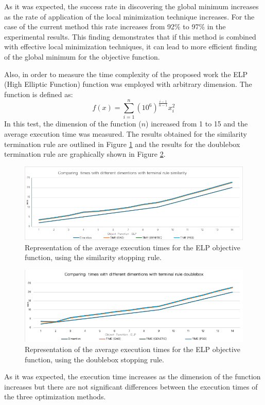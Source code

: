 \documentclass[journal,article,submit,pdftex,moreauthors]{Definitions/mdpi}
\begin{document}
As it was expected, the success rate in discovering the global minimum increases as the rate of application of the local minimization technique increases. For the case of the current method this rate increases from 92\% to 97\% in the experimental results. This finding demonstrates that if this method is combined with effective local minimization techniques, it can lead to more efficient finding of the global minimum for the objective function.

Also, in order to measure the time complexity of the proposed work the ELP (High Elliptic Function) function was employed with arbitrary dimension. The function is defined as:
\[
f(x)=\sum_{i=1}^{n}\left(10^{6}\right)^{\frac{i-1}{n-1}}x_{i}^{2}
\]
In this test, the dimension of the function ($n$) increased from 1 to 15 and the average execution time was measured. The results obtained for the similarity termination rule are outlined in Figure 
\ref{fig:timeSim} and the results for the doublebox termination rule are graphically shown in Figure \ref{fig:timeDouble}.

\begin{figure}[H]
\hspace{-5pt}\includegraphics[scale=0.5]{time_similarity.png}
\caption{Representation of the average execution times for the ELP objective function, using the similarity stopping rule. \label{fig:timeSim}}
\end{figure}

\begin{figure}[H]
\hspace{-5pt}\includegraphics[scale=0.5]{time_doublebox.png}
\caption{Representation of the  average execution times for the ELP objective function, using the doublebox stopping rule. \label{fig:timeDouble}}
\end{figure}
As it was expected, the execution time increases as the dimension of the function increases but there are not significant differences between the execution times of the three optimization methods.
\end{document}
